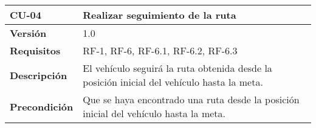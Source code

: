 \begin{longtable}[H]{@{}ll@{}}
\toprule
\begin{minipage}[b]{0.23\columnwidth}\raggedright\strut
\textbf{CU-04}\strut
\end{minipage} & \begin{minipage}[b]{0.71\columnwidth}\raggedright\strut
\textbf{Realizar seguimiento de la ruta}\strut
\end{minipage}\tabularnewline
\midrule
\endhead

\begin{minipage}[t]{0.23\columnwidth}\raggedright\strut
\textbf{Versión}\strut
\end{minipage} & \begin{minipage}[t]{0.71\columnwidth}\raggedright\strut
1.0\strut
\end{minipage}\tabularnewline

\begin{minipage}[t]{0.23\columnwidth}\raggedright\strut
\textbf{Requisitos}\strut
\end{minipage} & \begin{minipage}[t]{0.71\columnwidth}\raggedright\strut
RF-1, RF-6, RF-6.1, RF-6.2, RF-6.3\strut
\end{minipage}\tabularnewline

\begin{minipage}[t]{0.23\columnwidth}\raggedright\strut
\textbf{Descripción}\strut
\end{minipage} & \begin{minipage}[t]{0.71\columnwidth}\raggedright\strut
El vehículo seguirá la ruta obtenida desde la posición inicial del vehículo hasta la meta.\strut
\end{minipage}\tabularnewline

\begin{minipage}[t]{0.23\columnwidth}\raggedright\strut
\textbf{Precondición}\strut
\end{minipage} & \begin{minipage}[t]{0.71\columnwidth}\raggedright\strut Que se haya encontrado una ruta desde la posición inicial del vehículo hasta la meta.\strut
\end{minipage}\tabularnewline


\end{longtable}
